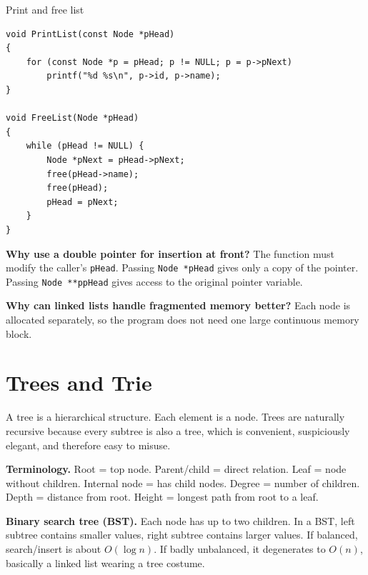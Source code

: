 \documentclass[9pt,a4paper]{article}
\newcommand{\code}[1]{\texttt{#1}}
\begin{document}
\begin{codebox}{Print and free list}
\begin{lstlisting}[style=cstyle]
void PrintList(const Node *pHead)
{
    for (const Node *p = pHead; p != NULL; p = p->pNext)
        printf("%d %s\n", p->id, p->name);
}

void FreeList(Node *pHead)
{
    while (pHead != NULL) {
        Node *pNext = pHead->pNext;
        free(pHead->name);
        free(pHead);
        pHead = pNext;
    }
}
\end{lstlisting}
\end{codebox}

\begin{exam}
\textbf{Why use a double pointer for insertion at front?} The function must modify the caller's \code{pHead}. Passing \code{Node *pHead} gives only a copy of the pointer. Passing \code{Node **ppHead} gives access to the original pointer variable.\par
\textbf{Why can linked lists handle fragmented memory better?} Each node is allocated separately, so the program does not need one large continuous memory block.
\end{exam}

\section{Trees and Trie}
\begin{idea}
A tree is a hierarchical structure. Each element is a node. Trees are naturally recursive because every subtree is also a tree, which is convenient, suspiciously elegant, and therefore easy to misuse.
\end{idea}

\textbf{Terminology.} Root = top node. Parent/child = direct relation. Leaf = node without children. Internal node = has child nodes. Degree = number of children. Depth = distance from root. Height = longest path from root to a leaf.

\textbf{Binary search tree (BST).} Each node has up to two children. In a BST, left subtree contains smaller values, right subtree contains larger values. If balanced, search/insert is about \(O(\log n)\). If badly unbalanced, it degenerates to \(O(n)\), basically a linked list wearing a tree costume.
\end{document}
